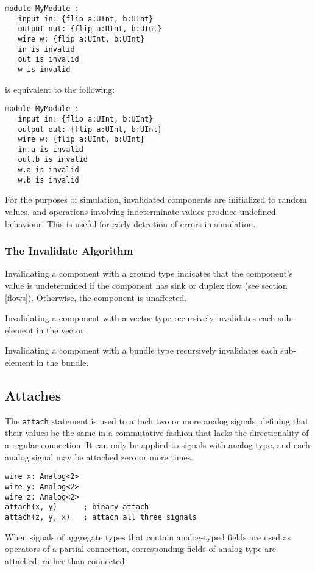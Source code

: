\documentclass[12pt]{article}
\begin{document}
\begin{lstlisting}
module MyModule :
   input in: {flip a:UInt, b:UInt}
   output out: {flip a:UInt, b:UInt}
   wire w: {flip a:UInt, b:UInt}
   in is invalid
   out is invalid
   w is invalid
\end{lstlisting}
is equivalent to the following:
\begin{lstlisting}
module MyModule :
   input in: {flip a:UInt, b:UInt}
   output out: {flip a:UInt, b:UInt}
   wire w: {flip a:UInt, b:UInt}
   in.a is invalid
   out.b is invalid
   w.a is invalid
   w.b is invalid
\end{lstlisting}

For the purposes of simulation, invalidated components are initialized to random values, and operations involving indeterminate values produce undefined behaviour. This is useful for early detection of errors in simulation.

\subsubsection{The Invalidate Algorithm}\label{invalidate_algorithm}
Invalidating a component with a ground type indicates that the component's value is undetermined if the component has sink or duplex flow (see section \ref{flows}). Otherwise, the component is unaffected.

Invalidating a component with a vector type recursively invalidates each sub-element in the vector.

Invalidating a component with a bundle type recursively invalidates each sub-element in the bundle.

\subsection{Attaches}

The \verb|attach| statement is used to attach two or more analog signals, defining that their
values be the same in a commutative fashion that lacks the directionality of a regular connection.
It can only be applied to signals with analog type, and each analog signal may be attached zero or
more times.

\begin{lstlisting}
wire x: Analog<2>
wire y: Analog<2>
wire z: Analog<2>
attach(x, y)      ; binary attach
attach(z, y, x)   ; attach all three signals
\end{lstlisting}

When signals of aggregate types that contain analog-typed fields are used as operators of a partial
connection, corresponding fields of analog type are attached, rather than connected.
\end{document}
